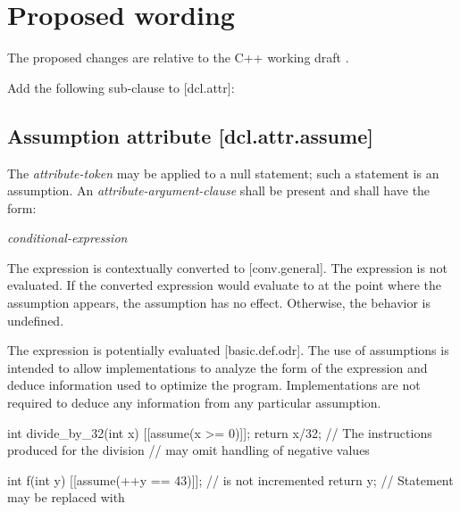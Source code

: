 
\section{Proposed wording}
\label{sec:wording}

The proposed changes are relative to the C++ working draft \cite{N4910}. 

Add the following sub-clause to [dcl.attr]:

\begin{adjustwidth}{0.5cm}{0.5cm}
\begin{addedblock}
\subsection*{Assumption attribute \hspace{7.33cm} [dcl.attr.assume]}

The \textit{attribute-token}  may be applied to a null statement; such a statement is an assumption. An \textit{attribute-argument-clause} shall be present and shall have the form:

\hspace{5mm}\tcode{( }\textit{conditional-expression}\tcode{ )}

The expression is contextually converted to  [conv.general]. The expression is not evaluated. If the converted expression would evaluate to  at the point where the assumption appears, the assumption has no effect. Otherwise, the behavior is undefined.

\begin{note}
The expression is potentially evaluated [basic.def.odr]. The use of assumptions is intended to allow implementations to analyze the form of the expression and deduce information used to optimize the program. Implementations are not required to deduce any information from any particular assumption.
\end{note}

\begin{example}
\begin{codeblock}
int divide_by_32(int x)  {
  [[assume(x >= 0)]];
  return x/32;   // The instructions produced for the division
                 //  may omit handling of negative values
}

int f(int y) {
  [[assume(++y == 43)]];   //  is not incremented
  return y;                // Statement may be replaced with 
}
\end{codeblock}
\end{example}
\end{addedblock}
\end{adjustwidth}

